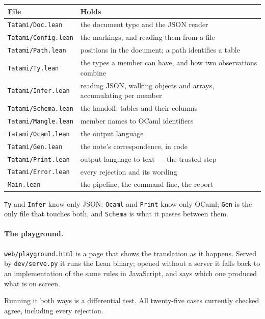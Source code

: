 \documentclass[11pt,a4paper]{article}
\begin{document}
\begin{center}
\begin{tabular}{@{}lp{9.3cm}@{}}
\hline
\textbf{File} & \textbf{Holds} \\
\hline
\texttt{Tatami/Doc.lean} & the document type and the JSON reader \\
\texttt{Tatami/Config.lean} & the markings, and reading them from a file \\
\texttt{Tatami/Path.lean} & positions in the document; a path identifies a
  table \\
\texttt{Tatami/Ty.lean} & the types a member can have, and how two
  observations combine \\
\texttt{Tatami/Infer.lean} & reading JSON, walking objects and arrays,
  accumulating per member \\
\texttt{Tatami/Schema.lean} & the handoff: tables and their columns \\
\texttt{Tatami/Mangle.lean} & member names to OCaml identifiers \\
\texttt{Tatami/Ocaml.lean} & the output language \\
\texttt{Tatami/Gen.lean} & the note's correspondence, in code \\
\texttt{Tatami/Print.lean} & output language to text --- the trusted step \\
\texttt{Tatami/Error.lean} & every rejection and its wording \\
\texttt{Main.lean} & the pipeline, the command line, the report \\
\hline
\end{tabular}
\end{center}

\noindent
\texttt{Ty} and \texttt{Infer} know only JSON; \texttt{Ocaml} and
\texttt{Print} know only OCaml; \texttt{Gen} is the only file that touches
both, and \texttt{Schema} is what it passes between them.

\paragraph{The playground.} \texttt{web/playground.html} is a page that shows
the translation as it happens. Served by \texttt{dev/serve.py} it runs the
Lean binary; opened without a server it falls back to an implementation of
the same rules in JavaScript, and says which one produced what is on screen.

Running it both ways is a differential test. All twenty-five cases currently
checked agree, including every rejection.
\end{document}
